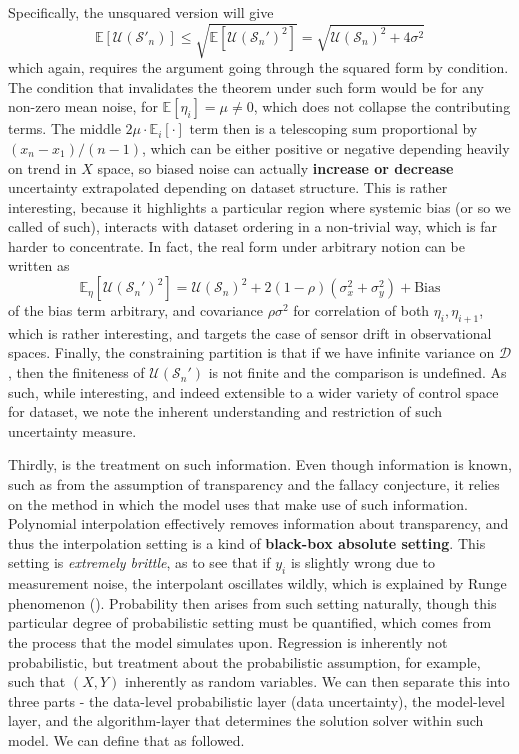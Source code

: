 Specifically, the unsquared version will give
\begin{equation}
    \mathbb{E}[\mathcal{U}(\mathcal{S}'_{n})] \leq \sqrt{\mathbb{E}[\mathcal{U}(\mathcal{S}_{n}')^{2}]} = \sqrt{\mathcal{U}(\mathcal{S}_{n})^{2}+ 4\sigma^{2}}
\end{equation}
which again, requires the argument going through the squared form by condition. The condition that invalidates the theorem under such form would be for any non-zero mean noise, for $\mathbb{E}[\eta_{i}]=\mu\neq 0$, which does not collapse the contributing terms. The middle $2\mu\cdot \mathbb{E}_{i}[\cdot]$ term then is a telescoping sum proportional by $(x_{n}-x_{1})/(n-1)$, which can be either positive or negative depending heavily on trend in $X$ space, so biased noise can actually \textbf{increase or decrease} uncertainty extrapolated depending on dataset structure. This is rather interesting, because it highlights a particular region where systemic bias (or so we called of such), interacts with dataset ordering in a non-trivial way, which is far harder to concentrate. In fact, the real form under arbitrary notion can be written as 
\begin{equation}
    \mathbb{E}_{\eta}[\mathcal{U}(\mathcal{S}_{n}')^{2}] = \mathcal{U}(\mathcal{S}_{n})^{2} + 2(1-\rho)(\sigma^{2}_{x}+\sigma_{y}^{2}) + \mathrm{Bias}
\end{equation}
of the bias term arbitrary, and covariance $\rho\sigma^{2}$ for correlation of both $\eta_{i},\eta_{i+1}$, which is rather interesting, and targets the case of sensor drift in observational spaces. Finally, the constraining partition is that if we have infinite variance on $\mathcal{D}$, then the finiteness of $\mathcal{U}(\mathcal{S}_{n}')$ is not finite and the comparison is undefined. As such, while interesting, and indeed extensible to a wider variety of control space for dataset, we note the inherent understanding and restriction of such uncertainty measure. 

Thirdly, is the treatment on such information. Even though information is known, such as from the assumption of transparency and the fallacy conjecture, it relies on the method in which the model uses that make use of such information. Polynomial interpolation effectively removes information about transparency, and thus the interpolation setting is a kind of \textbf{black-box absolute setting}. This setting is \textit{extremely brittle}, as to see that if $y_{i}$ is slightly wrong due to measurement noise, the interpolant oscillates wildly, which is explained by Runge phenomenon (\cite{Runge1901,CorlessSevyeri2018,AMC2009RungeDivergence}). Probability then arises from such setting naturally, though this particular degree of probabilistic setting must be quantified, which comes from the process that the model simulates upon. Regression is inherently not probabilistic, but treatment about the probabilistic assumption, for example, such that $(X,Y)$ inherently as random variables. We can then separate this into three parts - the data-level probabilistic layer (data uncertainty), the model-level layer, and the algorithm-layer that determines the solution solver within such model. We can define that as followed. 

